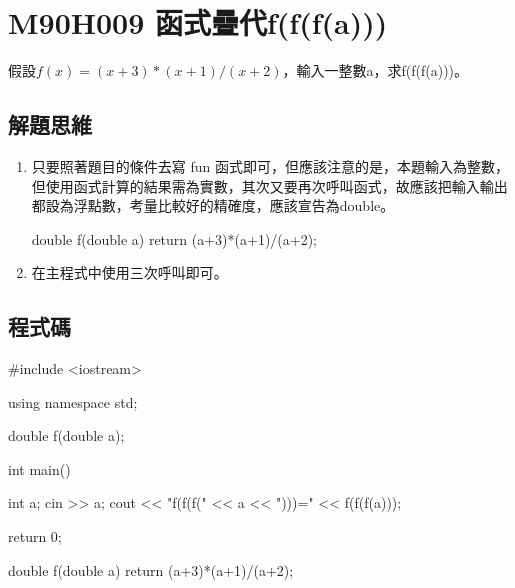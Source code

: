 \section{M90H009 函式疊代f(f(f(a)))}
假設$f(x)=(x+3)*(x+1)/(x+2)$，輸入一整數a，求f(f(f(a)))。
\subsection{解題思維}

\begin{enumerate}
	\item
	只要照著題目的條件去寫 fun 函式即可，但應該注意的是，本題輸入為整數，但使用函式計算的結果需為實數，其次又要再次呼叫函式，故應該把輸入輸出都設為浮點數，考量比較好的精確度，應該宣告為double。
	\begin{inside}
	double f(double a) {
		return (a+3)*(a+1)/(a+2);
	}
	\end{inside}
	\item 在主程式中使用三次呼叫即可。
\end{enumerate} 

\subsection{程式碼}
\begin{cppcode}
	#include <iostream>

	using namespace std;
	
	double f(double a);
	
	int main()
	{
		int a;
		cin >> a;
		cout << "f(f(f(" << a << ")))=" << f(f(f(a)));
		
		return 0;
	}
	
	double f(double a) {
		return (a+3)*(a+1)/(a+2);
	}
\end{cppcode}
